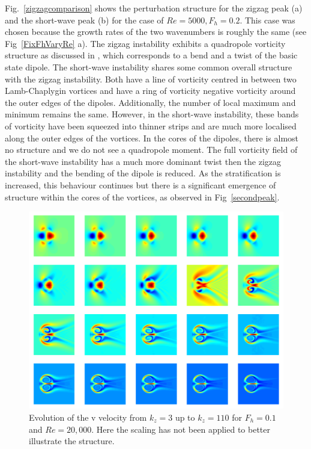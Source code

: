 Fig.~\ref{zigzagcomparison} shows the perturbation structure for the zigzag peak (a) and the short-wave peak (b) for the case of $Re=5000,F_{h}=0.2$. This case was chosen because the growth rates of the two wavenumbers is roughly the same (see Fig~\ref{FixFhVaryRe} a). The zigzag instability exhibits a quadropole vorticity structure as discussed in \cite{bc2000c}, which corresponds to a bend and a twist of the basic state dipole. The short-wave instability shares some common overall structure with the zigzag instability. Both have a line of vorticity centred in between two Lamb-Chaplygin vortices and have a ring of vorticity negative vorticity around the outer edges of the dipoles. Additionally, the number of local maximum and minimum remains the same. However, in the short-wave instability, these bands of vorticity have been squeezed into thinner strips and are much more localised along the outer edges of the vortices. In the cores of the dipoles, there is almost no structure and we do not see a quadropole moment. The full vorticity field of the short-wave instability has a much more dominant twist then the zigzag instability and the bending of the dipole is reduced. As the stratification is increased, this behaviour continues but there is a significant emergence of structure within the cores of the vortices, as observed in Fig~\ref{secondpeak}.


\begin{figure}
\begin{center}
\includegraphics[width=\textwidth]{velocity_field_evolution_u_fh_01_re_20000}
\caption{Evolution of the v velocity from $k_{z}=3$ up to $k_{z}=110$ for $F_{h}=0.1$ and $Re=20{,}000$. Here the scaling has not been applied to better illustrate the structure.}
\label{evolution}
\end{center}
\end{figure}

